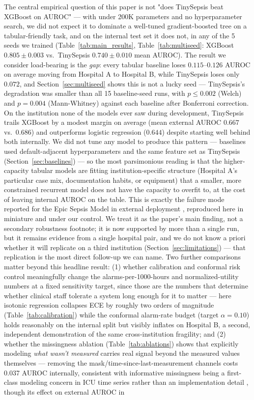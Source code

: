 \documentclass[11pt]{article}
\begin{document}
The central empirical question of this paper is not "does TinySepsis beat XGBoost on AUROC" --- with under 200K parameters and no hyperparameter search, we did not expect it to dominate a well-tuned gradient-boosted tree on a tabular-friendly task, and on the internal test set it does not, in any of the 5 seeds we trained (Table~\ref{tab:main_results}, Table~\ref{tab:multiseed}: XGBoost $0.805\pm0.003$ vs.\ TinySepsis $0.740\pm0.010$ mean AUROC). The result we consider load-bearing is the \emph{gap}: every tabular baseline loses $0.115$--$0.126$ AUROC on average moving from Hospital A to Hospital B, while TinySepsis loses only $0.072$, and Section~\ref{sec:multiseed} shows this is not a lucky seed --- TinySepsis's degradation was smaller than all 15 baseline-seed runs, with $p\le 0.002$ (Welch) and $p=0.004$ (Mann-Whitney) against each baseline after Bonferroni correction. On the institution none of the models ever saw during development, TinySepsis trails XGBoost by a modest margin on average (mean external AUROC $0.667$ vs.\ $0.686$) and outperforms logistic regression ($0.644$) despite starting well behind both internally. We did not tune any model to produce this pattern --- baselines used default-adjacent hyperparameters and the same feature set as TinySepsis (Section~\ref{sec:baselines}) --- so the most parsimonious reading is that the higher-capacity tabular models are fitting institution-specific structure (Hospital A's particular case mix, documentation habits, or equipment) that a smaller, more constrained recurrent model does not have the capacity to overfit to, at the cost of leaving internal AUROC on the table. This is exactly the failure mode reported for the Epic Sepsis Model in external deployment \citep{wong2021external, habib2021epic}, reproduced here in miniature and under our control. We treat it as the paper's main finding, not a secondary robustness footnote; it is now supported by more than a single run, but it remains evidence from a single hospital pair, and we do not know a priori whether it will replicate on a third institution (Section~\ref{sec:limitations}) --- that replication is the most direct follow-up we can name. Two further comparisons matter beyond this headline result: (1) whether calibration and conformal risk control meaningfully change the alarms-per-1000-hours and normalized-utility numbers at a fixed sensitivity target, since those are the numbers that determine whether clinical staff tolerate a system long enough for it to matter \citep{sendak2020real} --- here isotonic regression collapses ECE by roughly two orders of magnitude (Table~\ref{tab:calibration}) while the conformal alarm-rate budget (target $\alpha=0.10$) holds reasonably on the internal split but visibly inflates on Hospital B, a second, independent demonstration of the same cross-institution fragility; and (2) whether the missingness ablation (Table~\ref{tab:ablations}) shows that explicitly modeling \emph{what wasn't measured} carries real signal beyond the measured values themselves --- removing the mask/time-since-last-measurement channels costs 0.037 AUROC internally, consistent with informative missingness being a first-class modeling concern in ICU time series rather than an implementation detail \citep{che2018recurrent}, though its effect on external AUROC in 
\end{document}
